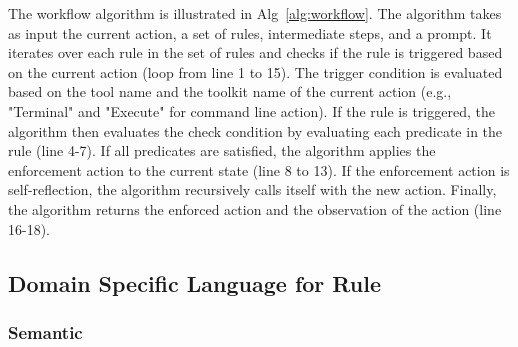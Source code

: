 The workflow algorithm is illustrated in Alg~\ref{alg:workflow}. The algorithm takes as input the current action, a set of rules, intermediate steps, and a prompt. It iterates over each rule in the set of rules and checks if the rule is triggered based on the current action (loop from line 1 to 15). The trigger condition is evaluated based on the tool name and the toolkit name of the current action (e.g., "Terminal" and "Execute" for command line action).
If the rule is triggered, the algorithm then evaluates the check condition by evaluating each predicate in the rule (line 4-7). 
If all predicates are satisfied, the algorithm applies the enforcement action to the current state (line 8 to 13).
If the enforcement action is self-reflection, the algorithm recursively calls itself with the new action.
Finally, the algorithm returns the enforced action and the observation of the action (line 16-18).

\subsection{Domain Specific Language for Rule}


\subsubsection{Semantic}




